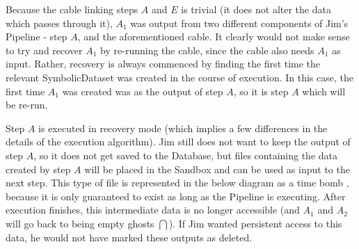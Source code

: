 \documentclass[12pt]{article}
\newcommand{\sd}{\bigcap} %
\begin{document}
Because the cable linking steps $A$ and $E$ is trivial (it does not alter the
data which passes through it), $A_1$ was output from two different components
of Jim's Pipeline - step $A$, and the aforementioned cable. It clearly would
not make sense to try and recover $A_1$ by re-running the cable, since the
cable also needs $A_1$ as input. Rather, recovery is always commenced by
finding the first time the relevant SymbolicDataset was created in the course
of execution. In this case, the first time $A_1$ was created was as the output
of step $A$, so it is step $A$ which will be re-run.

Step $A$ is executed in recovery mode (which implies a few differences in the
details of the execution algorithm). Jim still does not want to keep the output
of step $A$, so it does not get saved to the Database, but files containing the
data created by step $A$ will be placed in the Sandbox and can be used as input
to the next step. This type of file is represented in the below diagram as a
time bomb \bomb, because it is only guaranteed to exist as long as the Pipeline
is executing. After execution finishes, this intermediate data is no longer
accessible (and $A_1$ and $A_2$ will go back to being empty ghosts $\sd$). If
Jim wanted persistent access to this data, he would not have marked these
outputs as deleted.
\end{document}
